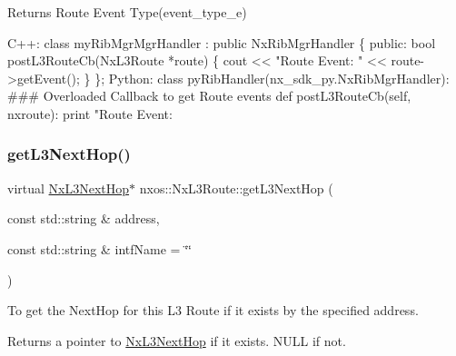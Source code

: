 \begin{DoxyReturn}{Returns}
Route Event Type(event\+\_\+type\+\_\+e)
\end{DoxyReturn}

\begin{DoxyCode}
C++:
   \textcolor{keyword}{class }myRibMgrMgrHandler : \textcolor{keyword}{public} NxRibMgrHandler \{
      \textcolor{keyword}{public}:
         \textcolor{keywordtype}{bool} postL3RouteCb(NxL3Route *route) \{
              cout << \textcolor{stringliteral}{"Route Event: "} << route->getEvent();
         \}
   \};
Python:
   \textcolor{keyword}{class }pyRibHandler(nx\_sdk\_py.NxRibMgrHandler):
\textcolor{preprocessor}{   ### Overloaded Callback to get Route events}
         def postL3RouteCb(self, nxroute):
             print "Route Event: %
\end{DoxyCode}
 \mbox{\label{classnxos_1_1_nx_l3_route_a79bd39e19c238b12f0af22d2781059cd}} 
\subsubsection{\texorpdfstring{get\+L3\+Next\+Hop()}{getL3NextHop()}\hspace{0.1cm}{\footnotesize\ttfamily [1/2]}}
{\footnotesize\ttfamily virtual \mbox{\hyperlink{classnxos_1_1_nx_l3_next_hop}{Nx\+L3\+Next\+Hop}}$\ast$ nxos\+::\+Nx\+L3\+Route\+::get\+L3\+Next\+Hop (\begin{DoxyParamCaption}\item[{const std\+::string \&}]{address,  }\item[{const std\+::string \&}]{intf\+Name = {\ttfamily \char`\"{}\char`\"{}} }\end{DoxyParamCaption})\hspace{0.3cm}{\ttfamily [pure virtual]}}

To get the Next\+Hop for this L3 Route if it exists by the specified address.

\begin{DoxyReturn}{Returns}
a pointer to \mbox{\hyperlink{classnxos_1_1_nx_l3_next_hop}{Nx\+L3\+Next\+Hop}} if it exists. N\+U\+LL if not.
\end{DoxyReturn}

